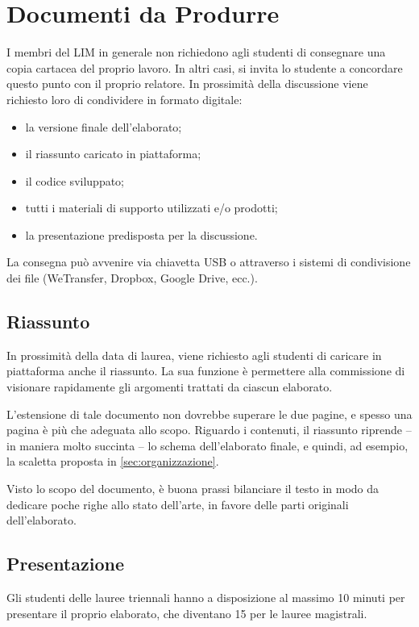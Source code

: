 \chapter{Documenti da Produrre}
I membri del LIM in generale non richiedono agli studenti di consegnare una copia cartacea del proprio lavoro. In altri casi, si invita lo studente a concordare questo punto con il proprio relatore.
In prossimità della discussione viene richiesto loro di condividere in formato digitale:
\begin{itemize}
	\item la versione finale dell'elaborato;
	\item il riassunto caricato in piattaforma;
	\item il codice sviluppato;
	\item tutti i materiali di supporto utilizzati e/o prodotti;
	\item la presentazione predisposta per la discussione.
\end{itemize}

La consegna può avvenire via chiavetta USB o attraverso i sistemi di condivisione dei file (WeTransfer, Dropbox, Google Drive, ecc.).

\section{Riassunto}
In prossimità della data di laurea, viene richiesto agli studenti di caricare in piattaforma anche il riassunto. La sua funzione è permettere alla commissione di visionare rapidamente gli argomenti trattati da ciascun elaborato.

L'estensione di tale documento non dovrebbe superare le due pagine, e spesso una pagina è più che adeguata allo scopo. Riguardo i contenuti, il riassunto riprende -- in maniera molto succinta -- lo schema dell'elaborato finale, e quindi, ad esempio, la scaletta proposta in \ref{sec:organizzazione}.

Visto lo scopo del documento, è buona prassi bilanciare il testo in modo da dedicare poche righe allo stato dell'arte, in favore delle parti originali dell'elaborato.

\section{Presentazione}
Gli studenti delle lauree triennali hanno a disposizione al massimo 10 minuti per presentare il proprio elaborato, che diventano 15 per le lauree magistrali. 

